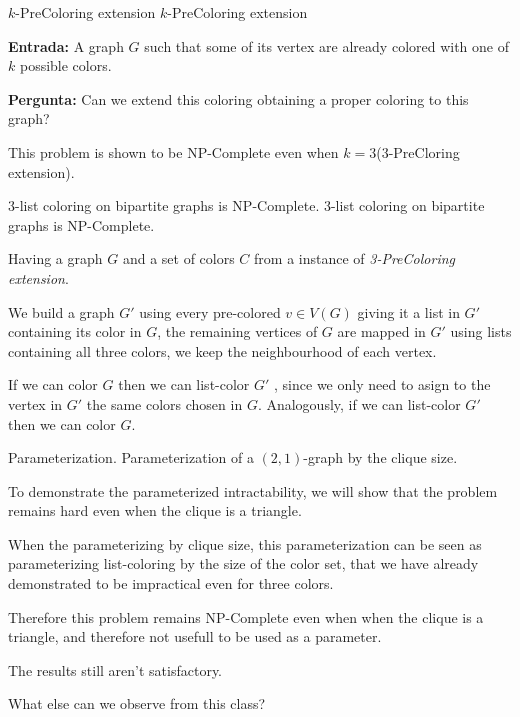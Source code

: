 \documentclass[9pt, compress]{beamer}
\newcommand{\?}{\textcolor{warn}{\textit{?}}}
\begin{document}
     \begin{frame}{$k$-PreColoring extension}
      \large{$k$-PreColoring extension}
      \normalsize\newline\newline
      
	      \textbf{Entrada:}  A graph $G$ such that some of its vertex are already colored with one of $k$ possible colors.
	      
	      \textbf{Pergunta:}  Can we extend this coloring obtaining a proper coloring to this graph?
	      
	      This problem is shown to be NP-Complete even when $k=3$(3-PreCloring extension).\cite{kratochvil94}
     \end{frame}
     
     \begin{frame}{3-list coloring on bipartite graphs is NP-Complete.}
    \large{3-list coloring on bipartite graphs is NP-Complete.}
      \normalsize\newline\newline
            
      Having a graph $G$ and a set of colors $C$ from a instance of \emph{3-PreColoring extension}.
      
      We build a graph $G'$ using every pre-colored $v \in V(G)$ giving it a list in $G'$ containing its color in $G$, the remaining vertices of $G$ are mapped in $G'$ using lists containing all three colors, we keep the neighbourhood of each vertex.
      
      If we can color $G$ then we can list-color $G'$ , since we only need to asign to the vertex in $G'$ the same colors chosen in $G$. Analogously, if we can list-color $G'$ then we can color $G$.
      
      
     \end{frame}
     \begin{frame}{Parameterization.}
    \large{Parameterization of a $(2,1)$-graph by the clique size.}
      \normalsize\newline\newline
            
      To demonstrate the parameterized intractability, we will show that the problem remains hard even when the clique is a triangle.
      
      When the parameterizing by clique size, this parameterization can be seen as parameterizing list-coloring by the size of the color set, that we have already demonstrated to be impractical even for three colors.
      
     Therefore this problem remains NP-Complete even when when the clique is a triangle, and therefore not usefull to be used as a parameter.
      
     \end{frame}
     \begin{frame}[standout]
       The results still aren't satisfactory.
       
       What else can we observe from this class?
     \end{frame}
     
\end{document}
